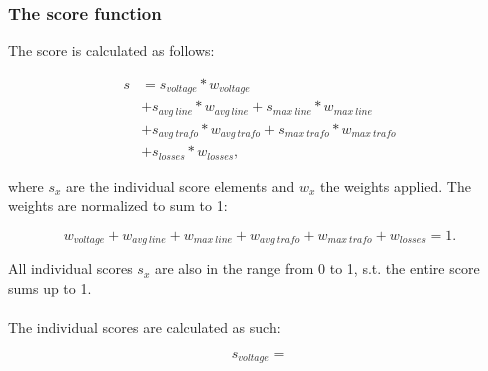 \subsubsection{The score function}

The score is calculated as follows:

\begin{align}
    s &= s_{voltage} * w_{voltage}\\
      &+ s_{avg \ line} * w_{avg \ line} + s_{max \ line} * w_{max \ line}\\
      & + s_{avg \ trafo} * w_{avg \ trafo} + s_{max \ trafo} * w_{max \ trafo}\\
      & + s_{losses} * w_{losses},
\end{align}

where $s_x$ are the individual score elements and $w_x$ the weights
applied. The weights are normalized to sum to 1:

\begin{equation}
    w_{voltage} + w_{avg \ line} + w_{max \ line} + w_{avg \ trafo} + w_{max \ trafo} + w_{losses} = 1.
\end{equation}

All individual scores $s_x$ are also in the range from 0 to 1, s.t. the
entire score sums up to 1.\\
\\
The individual scores are calculated as such:

\begin{equation}
    s_{voltage} = 
\end{equation}